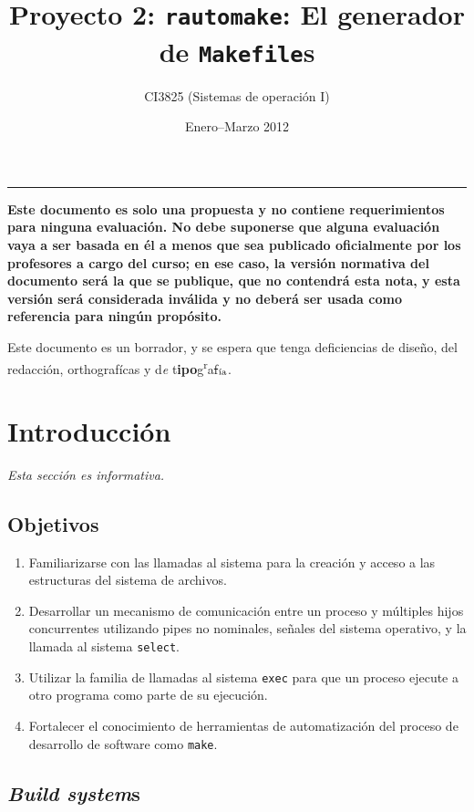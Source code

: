 \documentclass[]{article}
\title{Proyecto 2: \texttt{rautomake}: El generador de \texttt{Makefile}s}
\author{CI3825 (Sistemas de operación I)}
\date{Enero--Marzo 2012}
\newcommand{\textsubscr}[1]{\ensuremath{_{\scriptsize\textrm{#1}}}}
\begin{document}
\maketitle

\tableofcontents

\begin{center}\rule{3in}{0.4pt}\end{center}

\textbf{Este documento es solo una propuesta y no contiene
requerimientos para ninguna evaluación. No debe suponerse que alguna
evaluación vaya a ser basada en él a menos que sea publicado
oficialmente por los profesores a cargo del curso; en ese caso, la
versión normativa del documento será la que se publique, que no
contendrá esta nota, y esta versión será considerada inválida y no
deberá ser usada como referencia para ningún propósito.}

Este documento es un borrador, y se espera que tenga deficiencias de
diseño, del redacción, orthografícas y d\emph{e}
t\textbf{ipo}g\textsuperscript{r}a\sout{f}\textsubscr{ía}.

\newpage

\section{Introducción}

\emph{Esta sección es informativa.}

\subsection{Objetivos}

\begin{enumerate}[1.]
\item
  Familiarizarse con las llamadas al sistema para la creación y acceso a
  las estructuras del sistema de archivos.
\item
  Desarrollar un mecanismo de comunicación entre un proceso y múltiples
  hijos concurrentes utilizando pipes no nominales, señales del sistema
  operativo, y la llamada al sistema \texttt{select}.
\item
  Utilizar la familia de llamadas al sistema \texttt{exec} para que un
  proceso ejecute a otro programa como parte de su ejecución.
\item
  Fortalecer el conocimiento de herramientas de automatización del
  proceso de desarrollo de software como \texttt{make}.
\end{enumerate}
\subsection{\emph{Build system}s}
\end{document}
